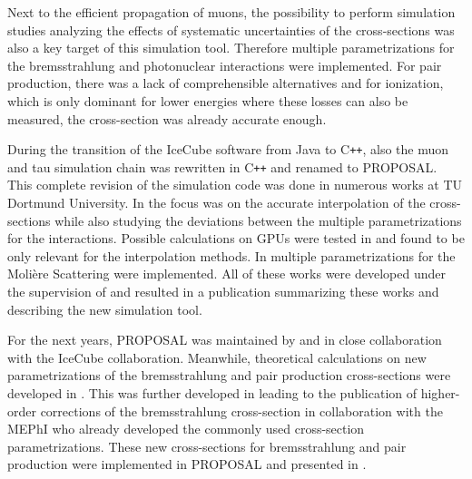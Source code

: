 Next to the efficient propagation of muons, the possibility to perform simulation studies analyzing the effects of systematic uncertainties of the cross-sections was also a key target of this simulation tool.
Therefore multiple parametrizations for the bremsstrahlung and photonuclear interactions were implemented.
For pair production, there was a lack of comprehensible alternatives and for ionization, which is only dominant for lower energies where these losses can also be measured, the cross-section was already accurate enough.

During the transition of the IceCube software from Java to C\texttt{++}, also the muon and tau simulation chain was rewritten in C\texttt{++} and renamed to PROPOSAL.
This complete revision of the simulation code was done in numerous works at TU Dortmund University.
In \cite{Frantzen11Diplom, Schmitz11Diplom} the focus was on the accurate interpolation of the cross-sections while also studying the deviations between the multiple parametrizations for the interactions.
Possible calculations on GPUs were tested in \cite{Fuchs12Master} and found to be only relevant for the interpolation methods.
In \cite{Geiselbrinck13Bachelor} multiple parametrizations for the Moli\`{e}re Scattering were implemented.
All of these works were developed under the supervision of \cite{Koehne13PhD} and resulted in a publication \cite{Koehne13PROPOSAL} summarizing these works and describing the new simulation tool.

For the next years, PROPOSAL was maintained by \cite{Fuchs16PhD} and in close collaboration with the IceCube collaboration.
Meanwhile, theoretical calculations on new parametrizations of the bremsstrahlung and pair production cross-sections were developed in \cite{Menne14Master, Sandrock14Master, Soedingrekso16Master}.
This was further developed in \cite{Sandrock18PhD} leading to the publication \cite{Sandrock18nlo} of higher-order corrections of the bremsstrahlung cross-section in collaboration with the MEPhI who already developed the commonly used cross-section parametrizations.
These new cross-sections for bremsstrahlung and pair production were implemented in PROPOSAL and presented in \cite{Soedingrekso19ICRC}.

